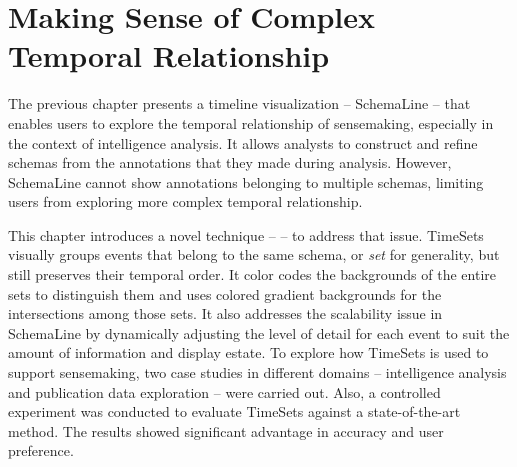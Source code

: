 \chapter{Making Sense of Complex Temporal Relationship}
\label{chap:timesets}

\graphicspath{{Chapter4/figures/}}


The previous chapter presents a timeline visualization -- SchemaLine -- that enables users to explore the temporal relationship of sensemaking, especially in the context of intelligence analysis. It allows analysts to construct and refine schemas from the annotations that they made during analysis. However, SchemaLine cannot show annotations belonging to multiple schemas, limiting users from exploring more complex temporal relationship. 

This chapter introduces a novel technique -- \emph{} -- to address that issue. TimeSets visually groups events that belong to the same schema, or \emph{set} for generality, but still preserves their temporal order. It color codes the backgrounds of the entire sets to distinguish them and uses colored gradient backgrounds for the intersections among those sets. It also addresses the scalability issue in SchemaLine by dynamically adjusting the level of detail for each event to suit the amount of information and display estate. To explore how TimeSets is used to support sensemaking, two case studies in different domains -- intelligence analysis and publication data exploration -- were carried out. Also, a controlled experiment was conducted to evaluate TimeSets against a state-of-the-art method. The results showed significant advantage in accuracy and user preference.








